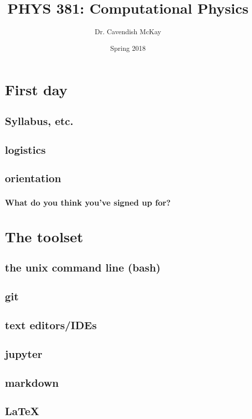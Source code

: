 \documentclass{tufte-handout}
\author{Dr. Cavendish McKay}
\date{Spring 2018}
\title{PHYS 381: Computational Physics}
\begin{document}
\maketitle


\section{First day}
\label{sec-1}
\subsection{Syllabus, etc.}
\label{sec-1-1}
\subsection{logistics}
\label{sec-1-2}
\subsection{orientation}
\label{sec-1-3}
\subsubsection{What do you think you've signed up for?}
\label{sec-1-3-1}

\section{The toolset}
\label{sec-2}
\subsection{the unix command line (bash)}
\label{sec-2-1}
\subsection{git}
\label{sec-2-2}
\subsection{text editors/IDEs}
\label{sec-2-3}
\subsection{jupyter}
\label{sec-2-4}
\subsection{markdown}
\label{sec-2-5}
\subsection{\LaTeX{}}
\label{sec-2-6}
\end{document}
